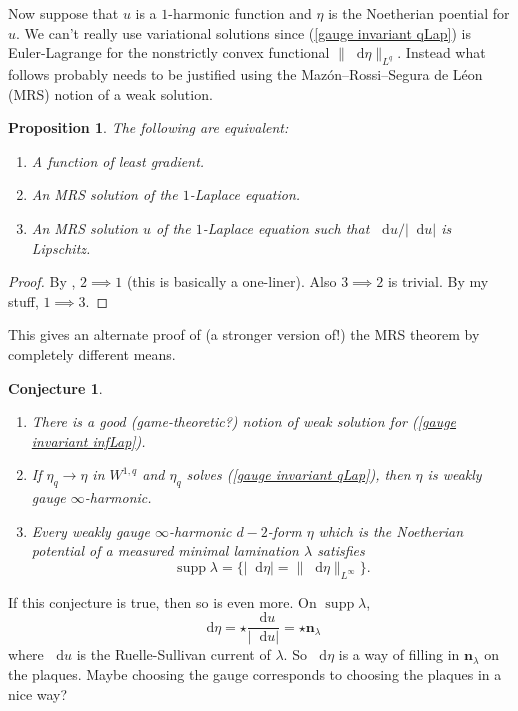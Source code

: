 \documentclass[reqno,12pt]{amsart}
\DeclareMathOperator{\supp}{supp}
\newcommand*\dif{\mathop{}\!\mathrm{d}}
\newcommand{\normal}{\mathbf n}
\newtheorem{proposition}[theorem]{Proposition}
\newtheorem{conjecture}[theorem]{Conjecture}
\theoremstyle{definition}
\numberwithin{equation}{section}
\begin{document}
Now suppose that $u$ is a $1$-harmonic function and $\eta$ is the Noetherian poential for $u$.
We can't really use variational solutions since (\ref{gauge invariant qLap}) is Euler-Lagrange for the nonstrictly convex functional $\|\dif \eta\|_{L^q}$.
Instead what follows probably needs to be justified using the Maz\'on--Rossi--Segura de L\'eon (MRS) notion of a weak solution. 

\begin{proposition}
The following are equivalent:
\begin{enumerate}
\item A function of least gradient.
\item An MRS solution of the $1$-Laplace equation.
\item An MRS solution $u$ of the $1$-Laplace equation such that $\dif u/|\dif u|$ is Lipschitz.
\end{enumerate}
\end{proposition}
\begin{proof}
By \cite[Theorem 2.5, (ii) implies (i)]{Mazon14}, $2 \implies 1$ (this is basically a one-liner).
Also $3 \implies 2$ is trivial.
By my stuff, $1 \implies 3$.
\end{proof}

This gives an alternate proof of (a stronger version of!) the MRS theorem \cite[Theorem 1.1(1)]{Mazon14} by completely different means. 

\begin{conjecture}
\begin{enumerate}
\item There is a good (game-theoretic?) notion of weak solution for (\ref{gauge invariant infLap}).
\item If $\eta_q \to \eta$ in $W^{1, q}$ and $\eta_q$ solves (\ref{gauge invariant qLap}), then $\eta$ is weakly gauge $\infty$-harmonic.
\item Every weakly gauge $\infty$-harmonic $d-2$-form $\eta$ which is the Noetherian potential of a measured minimal lamination $\lambda$ satisfies 
$$\supp \lambda = \{|\dif \eta| = \|\dif \eta\|_{L^\infty}\}.$$
\end{enumerate}
\end{conjecture}

If this conjecture is true, then so is even more. On $\supp \lambda$,
$$\dif \eta = \star \frac{\dif u}{|\dif u|} = \star \normal_\lambda$$
where $\dif u$ is the Ruelle-Sullivan current of $\lambda$. So $\dif \eta$ is a way of filling in $\normal_\lambda$ on the plaques.
Maybe choosing the gauge corresponds to choosing the plaques in a nice way?

\printbibliography
\end{document}
